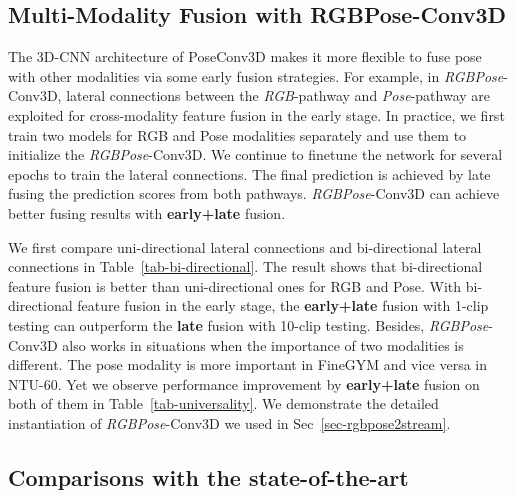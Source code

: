 \subsection{Multi-Modality Fusion with RGBPose-Conv3D}
The 3D-CNN architecture of PoseConv3D makes it more flexible to fuse pose with other modalities via some early fusion strategies.
For example, in \emph{RGBPose}-Conv3D, lateral connections between the \emph{RGB}-pathway and \emph{Pose}-pathway are exploited for cross-modality feature fusion in the early stage.
In practice, we first train two models for RGB and Pose modalities separately and use them to initialize the \emph{RGBPose}-Conv3D.
We continue to finetune the network for several epochs to train the lateral connections. 
The final prediction is achieved by late fusing the prediction scores from both pathways.
\emph{RGBPose}-Conv3D can achieve better fusing results with \textbf{early+late} fusion.

We first compare uni-directional lateral connections and bi-directional lateral connections in Table~\ref{tab-bi-directional}.
The result shows that bi-directional feature fusion is better than uni-directional ones for RGB and Pose. 
With bi-directional feature fusion in the early stage, the \textbf{early+late} fusion with 1-clip testing can outperform the \textbf{late} fusion with 10-clip testing. 
Besides, \emph{RGBPose}-Conv3D also works in situations when the importance of two modalities is different.
The pose modality is more important in FineGYM and vice versa in NTU-60. 
Yet we observe performance improvement by \textbf{early+late} fusion on both of them in Table~\ref{tab-universality}. 
We demonstrate the detailed instantiation of \emph{RGBPose}-Conv3D we used in Sec~\ref{sec-rgbpose2stream}. 

\subsection{Comparisons with the state-of-the-art}

